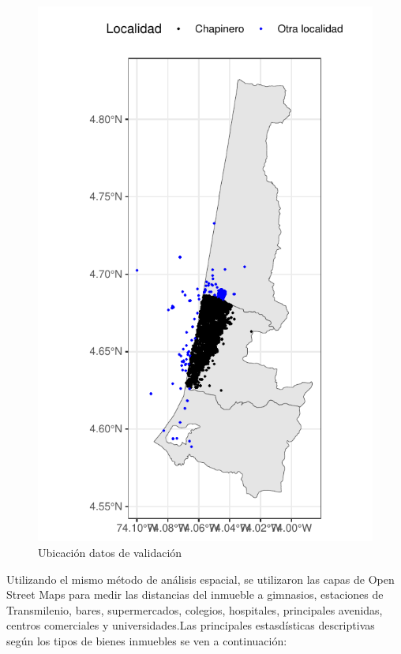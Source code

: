 \documentclass[
  11pt,
  letterpaper,
]{article}
\begin{document}
\begin{figure}[H]
\includegraphics[width=0.7\linewidth]{../views/figures/train_dots} \caption{Ubicación datos de validación}\label{fig:train-chapi-dots}
\end{figure}

Utilizando el mismo método de análisis espacial, se utilizaron las capas de Open Street Maps para medir las distancias del inmueble a gimnasios, estaciones de Transmilenio, bares, supermercados, colegios, hospitales, principales avenidas, centros comerciales y universidades.Las principales estasdísticas descriptivas según los tipos de bienes inmuebles se ven a continuación:
\end{document}
